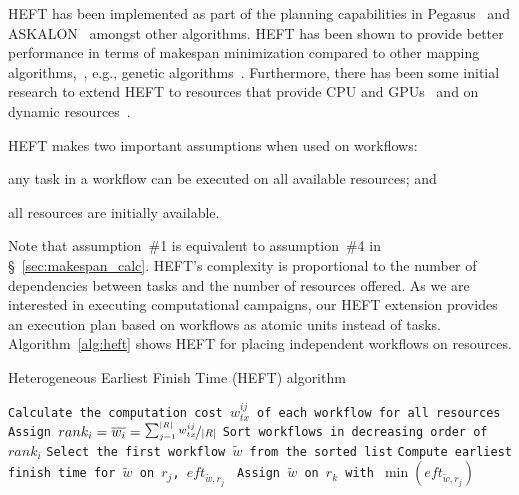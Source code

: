 HEFT has been implemented as part of the planning capabilities in Pegasus~\cite{deelman2015pegasus} and ASKALON~\cite{fahringer2005askalon} amongst other algorithms.
HEFT has been shown to provide better performance in terms of makespan minimization compared to other mapping algorithms,~\cite{topcuoglu2002performance,canon2008comparative}, e.g., genetic algorithms~\cite{fahringer2005askalon}. 
Furthermore, there has been some initial research to extend HEFT to resources that provide CPU and GPUs~\cite{shetti2013optimization} and on dynamic resources~\cite{dong2007pfas}. 

HEFT makes two important assumptions when used on workflows: 
\begin{inparaenum}[(1)] 
    \item any task in a workflow can be executed on all available resources; and 
    \item all resources are initially available.
\end{inparaenum}
Note that assumption~\#1 is equivalent to assumption~\#4 in \S~\ref{sec:makespan_calc}.
HEFT's complexity is proportional to the number of dependencies between tasks and the number of resources offered. 
As we are interested in executing computational campaigns, our HEFT extension provides an execution plan based on workflows as atomic units instead of tasks.
Algorithm~\ref{alg:heft} shows HEFT for placing independent workflows on resources.

\begin{algorithm}[t]
    \caption{Heterogeneous Earliest Finish Time (HEFT) algorithm}
    \label{alg:heft}
    \scriptsize
    \begin{algorithmic}[1]
        \State \texttt{Calculate the computation cost $w_{tx}^{ij}$ of each workflow for all resources}
        \State \texttt{Assign $rank_i = \overline{w_{i}} = \nicefrac{\sum_{j=1}^{|R|}w_{tx}^{ij}}{|R|}$}
        \State \texttt{Sort workflows in decreasing order of $rank_i$}
        \State \texttt{Select the first workflow $\tilde{w}$ from the sorted list}
        \State\texttt{Compute earliest finish time for $\tilde{w}$ on $r_{j}$, $eft_{\tilde{w},r_j}$ }
        \EndFor
        \State \texttt{Assign  $\tilde{w}$ on $r_k$ with $\min{(eft_{\tilde{w},r_j})}$}
        \EndWhile
        \EndProcedure
    \end{algorithmic}
\end{algorithm}

